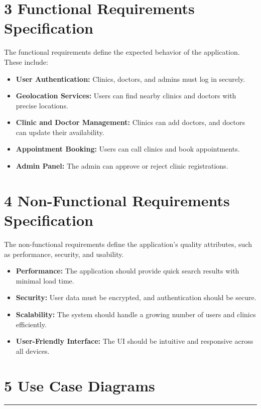 \documentclass[12pt]{report}
\begin{document}
\section*{\textbf{3 Functional Requirements Specification}}

\noindent The functional requirements define the expected behavior of the application. These include:

\begin{itemize}
	\item \textbf{User Authentication:} Clinics, doctors, and admins must log in securely.
	\item \textbf{Geolocation Services:} Users can find nearby clinics and doctors with precise locations.
	\item \textbf{Clinic and Doctor Management:} Clinics can add doctors, and doctors can update their availability.
	\item \textbf{Appointment Booking:} Users can call clinics and book appointments.
	\item \textbf{Admin Panel:} The admin can approve or reject clinic registrations.
\end{itemize}

\section*{\textbf{4 Non-Functional Requirements Specification}}
\noindent The non-functional requirements define the application's quality attributes, such as performance, security, and usability.

\begin{itemize}
	\item \textbf{Performance:} The application should provide quick search results with minimal load time.
	\item \textbf{Security:} User data must be encrypted, and authentication should be secure.
	\item \textbf{Scalability:} The system should handle a growing number of users and clinics efficiently.
	\item \textbf{User-Friendly Interface:} The UI should be intuitive and responsive across all devices.
\end{itemize}


\section*{\textbf{5 Use Case Diagrams}}
\rule{0.45\linewidth}{0.7pt}
\end{document}
